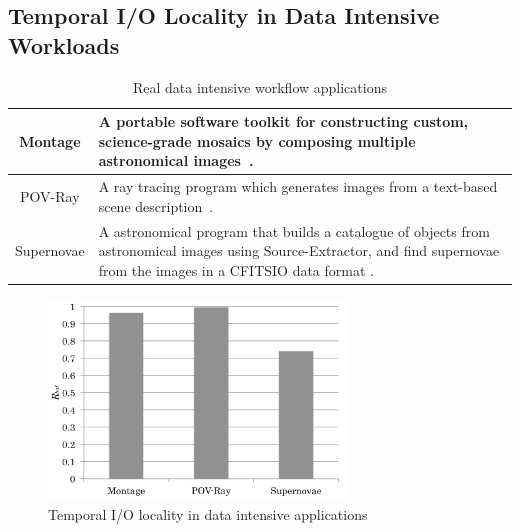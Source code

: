  



\subsection{Temporal I/O Locality in Data Intensive Workloads}
\label{ssec:data_access_locality}

\begin{table}
\centering
\begin{tabular}{|c|p{150pt}|}
\hline
\cellcolor{lightgray} Montage	&
 A portable software toolkit for constructing custom, science-grade mosaics by
 composing multiple astronomical images~\cite{montage}.\\\hline 
\cellcolor{lightgray} POV-Ray   &
 A ray tracing program which generates images
 from a text-based scene description~\cite{povray}.\\\hline
\cellcolor{lightgray} Supernovae &	
 A astronomical program that builds a catalogue of
objects from astronomical images using Source-Extractor\cite{SExtractor}, 
and find supernovae from the images in a CFITSIO data format \cite{fitsio}.
\\ \hline
\end{tabular}
\caption{Real data intensive workflow applications}
\label{background:work flow applications}
\end{table}

\begin{figure}
\centering
\includegraphics[width=8cm]{img/data_locality-2.pdf}
\caption{Temporal I/O locality in data intensive applications}
\label{background:data locality}
\end{figure}

